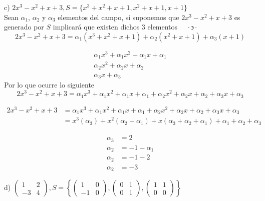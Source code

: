 \documentclass[letterpaper]{article}
\newcommand{\tq}{ \quad \cdot  \backepsilon \cdot \quad }
\renewcommand{\*}{\cdot}
\theoremstyle{definition}
\begin{document}
c) $2x^3 - x^2 + x + 3, S =  \lbrace x^3 + x^2 + x +1, x^2 + x +1, x +1 \rbrace$\\

Sean $\alpha_1 $, $\alpha_2$ y $\alpha_3$ elementos del campo, si suponemos que $2x^3 - x^2 + x + 3$ es generado por $S$ implicará que existen dichos 3 elementos $\tq$ 
\[ 2x^3 - x^2 + x + 3 = \alpha_1 (x^3 + x^2 + x +1) + \alpha_2 (x^2 + x +1) + \alpha_3 (x +1) \]

\begin{eqnarray}
	\alpha_1 x^3 + \alpha_1 x^2 + \alpha_1 x + \alpha_1 	\\
	\alpha_2 x^2 + \alpha_2 x + \alpha_2 \\
	\alpha_3 x + \alpha_3 
\end{eqnarray}
Por lo que ocurre lo siguiente
\[ 2x^3 - x^2 + x + 3 = \alpha_1 x^3 + \alpha_1 x^2 + \alpha_1 x + \alpha_1 + \alpha_2 x^2 + \alpha_2 x + \alpha_2 +\alpha_3 x + \alpha_3  \]

\begin{eqnarray*}
2x^3 - x^2 + x + 3 &= \alpha_1 x^3 + \alpha_1 x^2 + \alpha_1 x + \alpha_1 + \alpha_2 x^2 + \alpha_2 x + \alpha_2 +\alpha_3 x + \alpha_3 \\
 &= x^3 (\alpha_3)  + x^2 (\alpha_2 + \alpha_1) + x(\alpha_3 + \alpha_2 + \alpha_1) + \alpha_1 + \alpha_2 + \alpha_3
 \end{eqnarray*}
 
\begin{align*}
	\alpha_3 &=  2\\
	\alpha_2 &= -1 - \alpha_1 \\
	\alpha_2 &= -1 - 2\\
	\alpha_2 &= -3
\end{align*}



d) $ \begin{pmatrix} 1 & 2 \\ -3 & 4 \end{pmatrix},  S =  \left \lbrace \begin{pmatrix} 1 & 0 \\ -1 & 0 \end{pmatrix} , \begin{pmatrix} 0 & 1 \\ 0 &1 \end{pmatrix} , \begin{pmatrix} 1 & 1 \\ 0 &0 \end{pmatrix} \right \rbrace$

	
\end{document}

